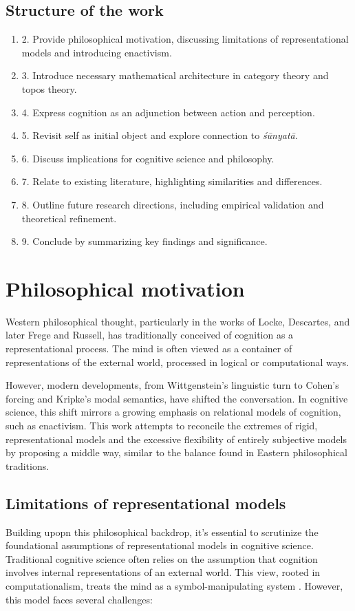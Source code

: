 \documentclass{article}
\begin{document}
\subsection{Structure of the work}
\begin{enumerate}[start=2,label=\S]
    \item 2. Provide philosophical motivation, discussing limitations of representational models and introducing enactivism.
    \item 3. Introduce necessary mathematical architecture in category theory and topos theory.
    \item 4. Express cognition as an adjunction between action and perception.
    \item 5. Revisit self as initial object and explore connection to \emph{śūnyatā}.
    \item 6. Discuss implications for cognitive science and philosophy.
    \item 7. Relate to existing literature, highlighting similarities and differences.
    \item 8. Outline future research directions, including empirical validation and theoretical refinement.
    \item 9. Conclude by summarizing key findings and significance.
\end{enumerate}

\section{Philosophical motivation}
Western philosophical thought, particularly in the works of Locke, Descartes, and later Frege and Russell, has traditionally conceived of cognition as a representational process. The mind is often viewed as a container of representations of the external world, processed in logical or computational ways.

However, modern developments, from Wittgenstein’s linguistic turn to Cohen’s forcing and Kripke’s modal semantics, have shifted the conversation. In cognitive science, this shift mirrors a growing emphasis on relational models of cognition, such as enactivism. This work attempts to reconcile the extremes of rigid, representational models and the excessive flexibility of entirely subjective models by proposing a middle way, similar to the balance found in Eastern philosophical traditions.

\subsection{Limitations of representational models}
Building upopn this philosophical backdrop, it's essential to scrutinize the foundational assumptions of representational models in cognitive science. Traditional cognitive science often relies on the assumption that cognition involves internal representations of an external world. This view, rooted in computationalism, treats the mind as a symbol-manipulating system \cite{fodor1980}. However, this model faces several challenges:
\end{document}
